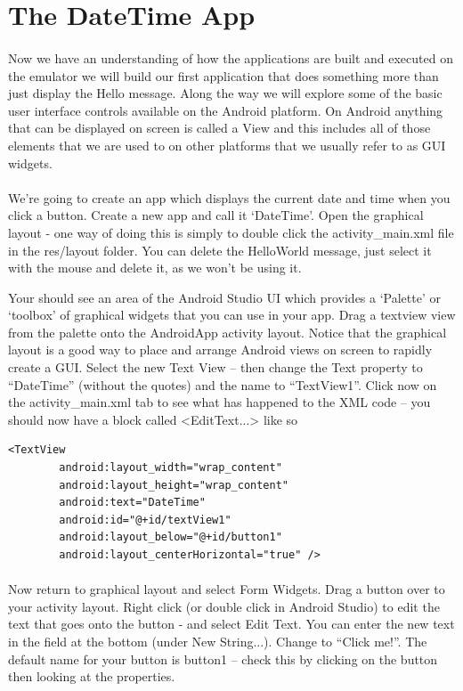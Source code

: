 \documentclass[12pt, a4paper, twoside]{book}
\begin{document}
\section{The DateTime App}
\paragraph{}Now we have an understanding of how the applications are built and executed on the emulator we will build our first application that does something more than just display the Hello message. Along the way we will explore some of the basic user interface controls available on the Android platform. On Android anything that can be displayed on screen is called a View and this includes all of those elements that we are used to on other platforms that we usually refer to as GUI widgets.

\paragraph{} We're going to create an app which displays the current date and time when you click a button. Create a new app and call it `DateTime'. Open the graphical layout - one way of doing this is simply to double click the activity\_main.xml file in the res/layout folder. You can delete the HelloWorld message, just select it with the mouse and delete it, as we won't be using it.

Your should see an area of the Android Studio UI which provides a `Palette' or `toolbox' of graphical widgets that you can use in your app. Drag a textview view from the palette onto the AndroidApp activity layout. Notice that the graphical layout is a good way to place and arrange Android views on screen to rapidly create a GUI. Select the new Text View – then change the Text property to ``DateTime'' (without the quotes) and the name to ``TextView1''. Click now on the activity\_main.xml tab to see what has happened to the XML code – you should now have a block called <EditText...> like so

\begin{lstlisting}
<TextView
        android:layout_width="wrap_content"
        android:layout_height="wrap_content"
        android:text="DateTime"
        android:id="@+id/textView1"
        android:layout_below="@+id/button1"
        android:layout_centerHorizontal="true" />
\end{lstlisting}

\paragraph{} Now return to graphical layout and select Form Widgets. Drag a button over to your activity layout.  Right click (or double click in Android Studio) to edit the text that goes onto the button - and select Edit Text. You can enter the new text in the field at the bottom (under New String...). Change to ``Click me!''. The default name for your button is button1 – check this by clicking on the button then looking at the properties.
\end{document}
